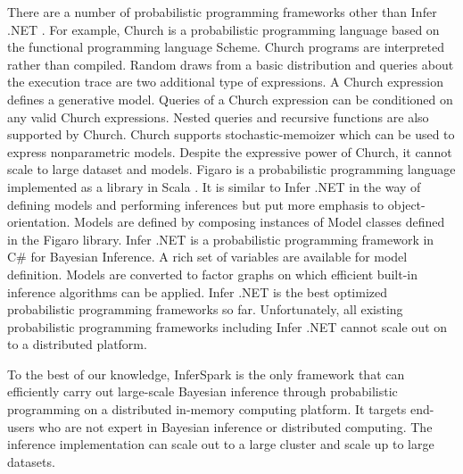 There are a number of probabilistic programming frameworks other than Infer
.NET . For example, Church  is a
probabilistic programming language based on the functional programming
language Scheme.  Church programs are interpreted rather than compiled.
Random draws from a basic distribution and queries about the execution trace
are two additional type of expressions. A Church expression defines a
generative model. Queries of a Church expression can be conditioned on any
valid Church expressions. Nested queries and recursive functions are also
supported by Church. Church supports stochastic-memoizer which can be used to
express nonparametric models.  Despite the expressive power of Church, it
cannot scale to large dataset and models.  Figaro is a probabilistic
programming language implemented as a library in Scala .  It
is similar to Infer .NET in the way of defining models and performing
inferences but put more emphasis to object-orientation. Models are defined by
composing instances of Model classes defined in the Figaro library.  Infer
.NET is a probabilistic programming framework in C\# for Bayesian Inference. A
rich set of variables are available for model definition. Models are converted
to factor graphs on which efficient built-in inference algorithms can be
applied.  Infer .NET is the best optimized probabilistic programming
frameworks so far.  Unfortunately, all existing probabilistic programming
frameworks including Infer .NET cannot scale out on to a distributed platform.

To the best of our knowledge, InferSpark is the only framework that can
efficiently carry out large-scale Bayesian inference through probabilistic
programming on a distributed in-memory computing platform. It targets
end-users who are not expert in Bayesian inference or distributed computing.
The inference implementation can scale out to a large cluster and scale up to
large datasets.

